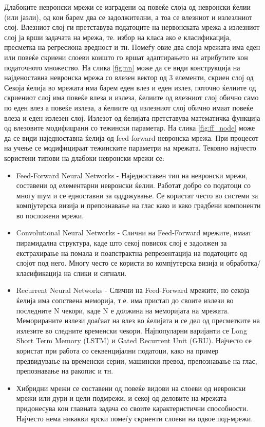 Длабоките невронски мрежи се изградени од повеќе слоја од невронски ќелии (или јазли), од кои барем два се задолжителни, а тоа се влезниот и излезлниот слој. Влезниот слој ги претставува податоците на нервонската мрежа а излезниот слој ја врши задачата на мрежа, те. избор на класа ако е класификација, пресметка на регресиона вредност и тн. Помеѓу овие два слоја мрежата има еден или повеќе скриени слоеви коишто го вршат адаптирањето на атрибутите кон податочното множество. На слика \ref{fig:nn} може да се види конструкција на најденоставна невронска мрежа со влезен вектор од 3 елементи, скриен слој од Секоја ќелија во мрежата има барем еден влез и еден излез, поточно ќелиите од скриениот слој има повеќе влеза и излеза, ќелиите од влезниот слој обично само по еден влез а повеќе излеза, а ќелиите од излезниот слој обично имаат повеќе влеза и еден излезен слој. Излезот од ќелијата претставува математичка функција од влезовите модифицрани со тежински параметар. На слика \ref{fig:ff_node} може да се види наједноставна ќелија од feed-forward невронска мрежа. При процесот на учење се модифицираат тежинските параметри на мрежата.
Тековно најчесто користени типови на длабоки невронски мрежи се:
\begin{itemize}
    \item Feed-Forward Neural Networks - Наједноставен тип на невронски мрежи, составени од елементарни невронски ќелии. Работат добро со податоци со многу шум и се едноставни за оддржување. Се користат често во системи за компјутерска визија и препознавање на глас како и како градбени компоненти во посложени мрежи.
    \item Convolutional Neural Networks - Слични на Feed-Forward мрежите, имаат пирамидална структура, каде што секој повисок слој е задолжен за екстрахирање на помала и поапстрактна репрезентација на податоците од слојот под него. Многу често се користи во компјутерска визија и обработка/класификација на слики и сигнали.
    \item Recurrent Neural Networks - Слични на Feed-Forward мрежите, но секоја ќелија има сопствена меморија, т.е. има пристап до своите излези во последните N чекори, каде N е должина на меморијата на мрежата. Меморираните излези доаѓаат на влез во ќелијата и се дел од пресметките на излезите во следните временски чекори. Најпопуларни варијанти се Long Short Term Memory (LSTM) и Gated Recurrent Unit (GRU). Најчесто се користат при работа со секвенцијални податоци, како на пример предвидување на временски серии, машински превод, препознавање на глас, препознавање на ракопис и тн.
    \item Хибридни мрежи се составени од повеќе видови на слоеви од невронски мрежи или дури и цели подмрежи, и секој од деловите на мрежата придонесува кон главната задача со своите карактеристични способности. Најчесто нема никакви врски помеѓу скриенти слоеви на одвое под-мрежи.
\end{itemize}

